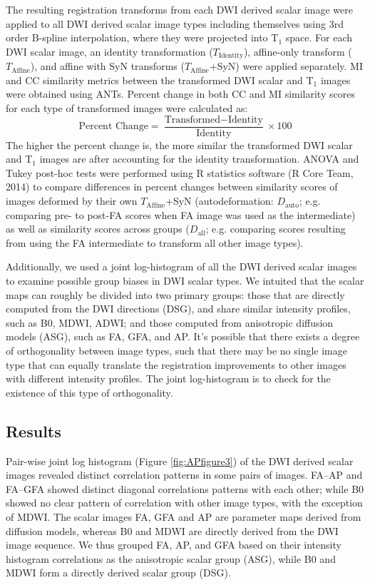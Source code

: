 The resulting registration transforms from each DWI derived scalar image were applied to all DWI derived scalar image types including themselves using 3rd order B-spline interpolation, where they were projected into T$_1$ space. For each DWI scalar image, an identity transformation ($T_{\text{Identity}}$), affine-only transform ($T_{\text{Affine}}$), and affine with SyN transforms ($T_{\text{Affine}}$+SyN) were applied separately. MI and CC similarity metrics between the transformed DWI scalar and T$_1$ images were obtained using ANTs. Percent change in both CC and MI similarity scores for each type of transformed images were calculated as:
\begin{equation}
\text{Percent Change} = \frac{\text{Transformed} - \text{Identity}}{\text{Identity}} \times 100
\end{equation}
The higher the percent change is, the more similar the transformed DWI scalar and T$_1$ images are after accounting for the identity transformation.
ANOVA and Tukey post-hoc tests were performed using R statistics software (R Core Team, 2014) to compare differences in percent changes between similarity scores of images deformed by their own $T_{\text{Affine}}$+SyN (autodeformation: $D_{\text{auto}}$; e.g. comparing pre- to post-FA scores when FA image was used as the intermediate) as well as similarity scores across groups ($D_{\text{all}}$; e.g. comparing scores resulting from using the FA intermediate to transform all other image types). 

Additionally, we used a joint log-histogram of all the DWI derived scalar images to examine possible group biases in DWI scalar types. We intuited that the scalar maps can roughly be divided into two primary groups: those that are directly computed from the DWI directions (DSG), and share similar intensity profiles, such as B0, MDWI, ADWI; and those computed from anisotropic diffusion models (ASG), such as FA, GFA, and AP. It’s possible that there exists a degree of orthogonality between image types, such that there may be no single image type that can equally translate the registration improvements to other images with different intensity profiles. The joint log-histogram is to check for the existence of this type of orthogonality. 

\subsection{Results}
Pair-wise joint log histogram (Figure \ref{fig:APfigure3}) of the DWI derived scalar images revealed distinct correlation patterns in some pairs of images. FA–AP and FA–GFA showed distinct diagonal correlations patterns with each other; while B0 showed no clear pattern of correlation with other image types, with the exception of MDWI. The scalar images FA, GFA and AP are parameter maps derived from diffusion models, whereas B0 and MDWI are directly derived from the DWI image sequence. We thus grouped FA, AP, and GFA based on their intensity histogram correlations as the anisotropic scalar group (ASG), while B0 and MDWI form a directly derived scalar group (DSG). 

